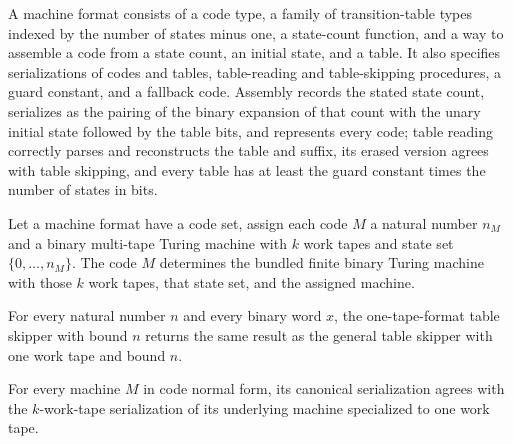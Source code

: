 \begin{definition}
\label{Turing.MachineFormat}
\leanok
{}
A machine format consists of a code type, a family of transition-table types indexed by
the number of states minus one, a state-count function, and a way to assemble a code
from a state count, an initial state, and a table. It also specifies serializations of
codes and tables, table-reading and table-skipping procedures, a guard constant, and a
fallback code. Assembly records the stated state count, serializes as the pairing of the
binary expansion of that count with the unary initial state followed by the table bits,
and represents every code; table reading correctly parses and reconstructs the table and
suffix, its erased version agrees with table skipping, and every table has at least the
guard constant times the number of states in bits.
\end{definition}

\begin{definition}
\label{Turing.MachineFormat.toFinTM}
\leanok
{}
Let a machine format have a code set, assign each code $M$ a natural number $n_M$ and a
binary multi-tape Turing machine with $k$ work tapes and state set $\{0,\ldots,n_M\}$.
The code $M$ determines the bundled finite binary Turing machine with those $k$ work
tapes, that state set, and the assigned machine.
\end{definition}

\begin{lemma}
\label{Turing.oneTape_skipTable_eq}
\leanok
{}
For every natural number $n$ and every binary word $x$, the one-tape-format table
skipper with bound $n$ returns the same result as the general table skipper with one
work tape and bound $n$.
\end{lemma}

\begin{lemma}
\label{Turing.oneTape_serialize_eq}
\leanok
{}
For every machine $M$ in code normal form, its canonical serialization agrees with the
$k$-work-tape serialization of its underlying machine specialized to one work tape.
\end{lemma}


